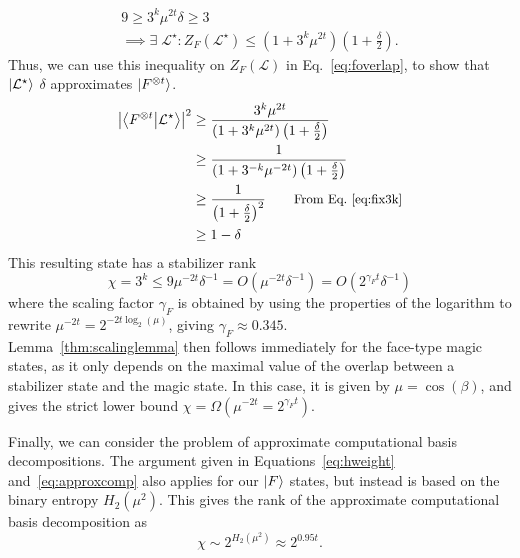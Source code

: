 \documentclass{standalone}
\begin{document}
\begin{align}
\label{eq:fix3k}
9\geq 3^{k}\mu^{2t}\delta\geq 3\\
\label{eq:Zfbound}
\implies\exists\;\mathcal{L}^{\star} : Z_{F}\left(\mathcal{L}^{\star}\right)\leq \left(1+3^{k}\mu^{2t}\right)\left(1+\frac{\delta}{2}\right).
\end{align}
Thus, we can use this inequality on $Z_{F}(\mathcal{L})$ in Eq.~\ref{eq:foverlap}, to show that$\ket{\mathcal{L}^{\star}}$ $\delta$ approximates $\ket{F^{\otimes t}}$.
\begin{align}
\begin{split}
    \left| \braket{F^{\otimes t}}{\mathcal{L}^{\star}}\right|^{2} &\geq
    \frac{3^{k}\mu^{2t}}{\left(1+3^{k}\mu^{2t}\right)\left(1+\frac{\delta}{2}\right)}  \\
    &\geq \frac{1}{\left(1+3^{-k}\mu^{-2t}\right)\left(1+\frac{\delta}{2}\right)}\\
    &\geq \frac{1}{\left(1+\frac{\delta}{2}\right)^{2}} \qquad \text{\small{From Eq.~\ref{eq:fix3k}}}\\
    &\geq 1-\delta \\
\end{split}
\end{align}
This resulting state has a stabilizer rank 
\begin{equation}
\chi=3^{k}\leq 9\mu^{-2t}\delta^{-1} = O\left(\mu^{-2t}\delta^{-1}\right)=O\left(2^{\gamma_{F}t}\delta^{-1}\right)
\end{equation}
where the scaling factor $\gamma_{F}$ is obtained by using the properties of the logarithm to rewrite $\mu^{-2t}=2^{-2t\log_{2}(\mu)}$, giving $\gamma_{F}\approx0.345$.\\
Lemma~\ref{thm:scalinglemma} then follows immediately for the face-type magic states, as it only depends on the maximal value of the overlap between a stabilizer state and the magic state. In this case, it is given by $\mu=\cos(\beta)$, and gives the strict lower bound $\chi=\Omega\left(\mu^{-2t}=2^{\gamma_{F}t}\right)$.
\par
Finally, we can consider the problem of approximate computational basis decompositions. The argument given in Equations~\ref{eq:hweight} and~\ref{eq:approxcomp} also applies for our $\ket{F}$ states, but instead is based on the binary entropy $H_{2}(\mu^{2})$. This gives the rank of the approximate computational basis decomposition as
\begin{equation}
    \chi\sim 2^{H_{2}(\mu^{2})}\approx 2^{0.95t}.
\end{equation}
\end{document}

